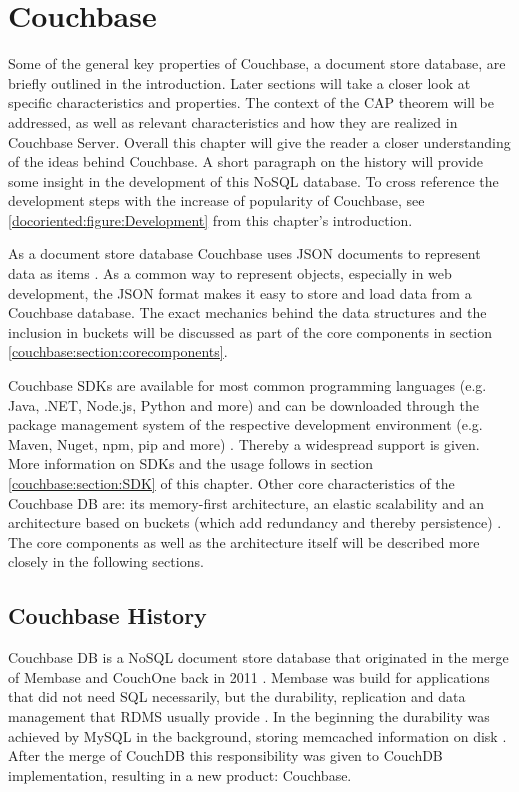 \section{Couchbase}
Some of the general key properties of Couchbase, a document store database, are briefly outlined in the introduction. Later sections will take a closer look at specific characteristics and properties. The context of the CAP theorem will be addressed, as well as relevant characteristics and how they are realized in Couchbase Server. Overall this chapter will give the reader a closer understanding of the ideas behind Couchbase. A short paragraph on the history will provide some insight in the development of this NoSQL database. To cross reference the development steps with the increase of popularity of Couchbase, see \autoref{docoriented:figure:Development} from this chapter’s introduction.

As a document store database Couchbase uses JSON documents to represent data as items \parencite{couchbaseAbout} \parencite{objelean}. As a common way to represent objects, especially in web development, the JSON format makes it easy to store and load data from a Couchbase database. The exact mechanics behind the data structures and the inclusion in buckets will be discussed as part of the core components in section \ref{couchbase:section:corecomponents}.

Couchbase SDKs are available for most common programming languages (e.g. Java, .NET, Node.js, Python and more) and can be downloaded through the package management system of the respective development environment (e.g. Maven, Nuget, npm, pip and more) \parencite{couchbaseWeb} \parencite{objelean}. Thereby a widespread support is given. More information on SDKs and the usage follows in section \ref{couchbase:section:SDK} of this chapter.
Other core characteristics of the Couchbase DB are: its memory-first architecture, an elastic scalability and an architecture based on buckets (which add redundancy and thereby persistence) \parencite{couchbaseWeb}. The core components as well as the architecture itself will be described more closely in the following sections.

\subsection{Couchbase History}
Couchbase DB is a NoSQL document store database that originated in the merge of Membase and CouchOne back in 2011 \parencite{couchbaseWeb}. Membase was build for applications that did not need SQL necessarily, but the durability, replication and data management that RDMS usually provide \parencite{ingenthron}. In the beginning the durability was achieved by MySQL in the background, storing memcached information on disk \parencite{popescuBacalu}. After the merge of CouchDB this responsibility was given to CouchDB implementation, resulting in a new product: Couchbase.

